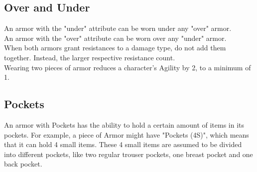 \subsection{Over and Under}\label{armor:under}
An armor with the "under" attribute can be worn under any "over" armor.\\
An armor with the "over" attribute can be worn over any "under" armor.\\
When both armors grant resistances to a damage type, do not add them together.
Instead, the larger respective resistance count.\\
Wearing two pieces of armor reduces a character's Agility by 2, to a minimum of 1.

\subsection{Pockets}\label{armor:pockets}
An armor with Pockets has the ability to hold a certain amount of items in its pockets.
For example, a piece of Armor might have "Pockets (4S)", which means that it can hold 4 small items.
These 4 small items are assumed to be divided into different pockets, like two regular trouser pockets, one breast pocket and one back pocket.